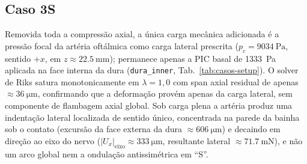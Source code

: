 \documentclass[12pt,a4paper]{article}
\begin{document}
\subsection*{Caso 3S}
\label{sec:res-caso3s}

Removida toda a compressão axial, a única carga mecânica adicionada é a pressão focal da artéria oftálmica como carga lateral prescrita ($p_c = \SI{9034}{\pascal}$, sentido $+x$, em $z \approx \SI{22.5}{\milli\meter}$); permanece apenas a PIC basal de \SI{1333}{\pascal} aplicada na face interna da dura (\texttt{dura\_inner}, Tab.~\ref{tab:casos-setup}). O solver de Riks satura monotonicamente em $\lambda = 1{,}0$ com span axial residual de apenas $\approx \SI{36}{\micro\meter}$, confirmando que a deformação provém apenas da carga lateral, sem componente de flambagem axial global. Sob carga plena a artéria produz uma indentação lateral localizada de sentido único, concentrada na parede da bainha sob o contato (excursão da face externa da dura $\approx \SI{606}{\micro\meter}$) e decaindo em direção ao eixo do nervo ($|U_x|_{\mathrm{eixo}} \approx \SI{333}{\micro\meter}$, resultante lateral $\approx \SI{71.7}{\milli\newton}$), e não um arco global nem a ondulação antissimétrica em ``S''.
\end{document}
